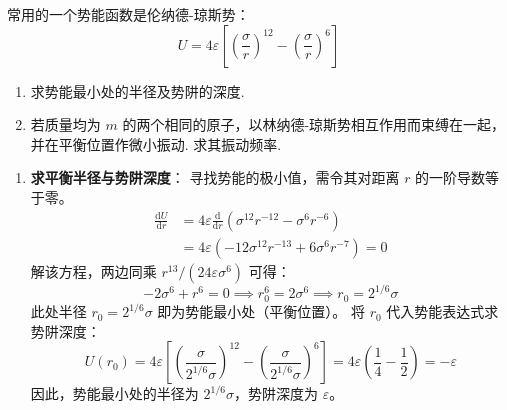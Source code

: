 \begin{exercise}\label{ex:7.2}
常用的一个势能函数是伦纳德-琼斯势：
$$U = 4\varepsilon \left[ \left(\frac{\sigma}{r}\right)^{12} - \left(\frac{\sigma}{r}\right)^6 \right]$$
\begin{enumerate}
  \item[(a)] 求势能最小处的半径及势阱的深度.
  \item[(b)] 若质量均为 $m$ 的两个相同的原子，以林纳德-琼斯势相互作用而束缚在一起，并在平衡位置作微小振动. 求其振动频率.
\end{enumerate}
\end{exercise}
\begin{solution}
\begin{enumerate}
    \item[(a)] \textbf{求平衡半径与势阱深度}：
    寻找势能的极小值，需令其对距离 $r$ 的一阶导数等于零。
    \begin{align*}
        \frac{\mathrm{d}U}{\mathrm{d}r} &= 4\varepsilon \frac{\mathrm{d}}{\mathrm{d}r} \left( \sigma^{12} r^{-12} - \sigma^6 r^{-6} \right) \\
                      &= 4\varepsilon \left( -12 \sigma^{12} r^{-13} + 6 \sigma^6 r^{-7} \right) = 0
    \end{align*}
    解该方程，两边同乘 $r^{13} / (24\varepsilon \sigma^6)$ 可得：
    $$ -2 \sigma^6 + r^6 = 0 \implies r_0^6 = 2 \sigma^6 \implies r_0 = 2^{1/6} \sigma $$
    此处半径 $r_0 = 2^{1/6} \sigma$ 即为势能最小处（平衡位置）。
    将 $r_0$ 代入势能表达式求势阱深度：
    $$ U(r_0) = 4\varepsilon \left[ \left( \frac{\sigma}{2^{1/6}\sigma} \right)^{12} - \left( \frac{\sigma}{2^{1/6}\sigma} \right)^6 \right] = 4\varepsilon \left( \frac{1}{4} - \frac{1}{2} \right) = -\varepsilon $$
    因此，势能最小处的半径为 $2^{1/6} \sigma$，势阱深度为 $\varepsilon$。


\end{enumerate}
\end{solution}
